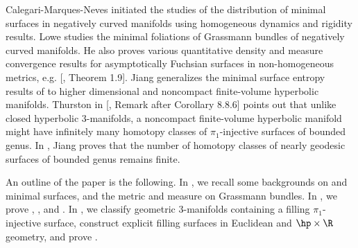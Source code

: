 Calegari-Marques-Neves \cite{cmnCountingminimal} initiated the studies of the distribution of minimal surfaces in negatively curved manifolds using homogeneous dynamics and rigidity results. Lowe \cite{lbDeformationsTotallyGeodesic} studies the minimal foliations of Grassmann bundles of negatively curved manifolds. He also proves various quantitative density and measure convergence results for asymptotically Fuchsian surfaces in non-homogeneous metrics, e.g. [, Theorem 1.9]. Jiang \cite{jrMinimalSurfaceEntropyCusped} generalizes the minimal surface entropy results of \cite{cmnCountingminimal} to higher dimensional and  noncompact finite-volume hyperbolic manifolds. Thurston in [, Remark after Corollary 8.8.6] points out that unlike closed hyperbolic $3$-manifolds, a noncompact finite-volume hyperbolic manifold might have infinitely many homotopy classes of $\pi_1$-injective surfaces of bounded genus. In \cite{jrMinimalSurfaceEntropyCusped}, Jiang proves that the number of homotopy classes of nearly geodesic surfaces of bounded genus remains finite. 

An outline of the paper is the following. In , we recall some backgrounds on \qf and minimal surfaces, and the metric and measure on Grassmann bundles. In , we prove , , and . In , we classify geometric $3$-manifolds containing a filling $\pi_1$-injective surface, construct explicit filling surfaces in Euclidean and $\hp\times \R $ geometry, and prove . 